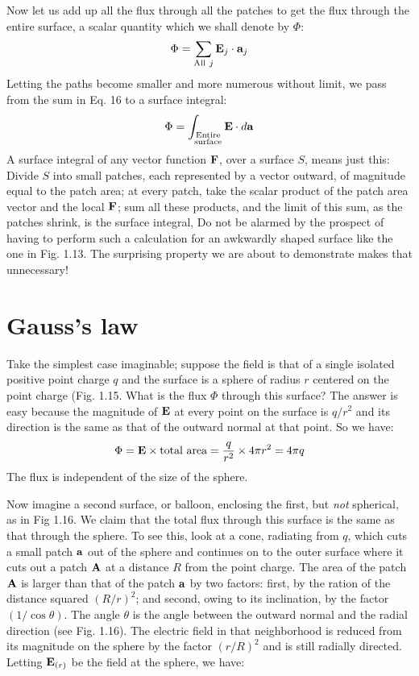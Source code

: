 Now let us add up all the flux through all the patches to get the
flux through the entire surface, a scalar quantity which we shall
denote by $\Phi$:
\begin{equation} 
  \Phi= \sum\limits_{\text{All}~j}\mathbf{E}_j \cdot \mathbf{a}_j 
\end{equation}
Letting the paths become smaller and more numerous without limit, we
pass from the sum in Eq. 16 to a surface integral:
\begin{equation}
  \Phi= \int\nolimits_{\substack{\text{Entire}\\\text{surface}}}\mathbf{E} \cdot d\mathbf{a}
\end{equation}
A surface integral of any vector function $\mathbf{F}$, over a surface
$S$, means just this: Divide $S$ into small patches, each represented
by a vector outward, of magnitude equal to the patch area; at every
patch, take the scalar product of the patch area vector and the local
$\mathbf{F}$; sum all these products, and the limit of this sum, as the
patches shrink, is the surface integral, Do not be alarmed by the
prospect of having to perform such a calculation for an awkwardly
shaped surface like the one in Fig. 1.13. The surprising property
we are about to demonstrate makes that unnecessary!

\section{Gauss's law}

Take the simplest case imaginable; suppose the field is that of a
single isolated positive point charge $q$ and the surface is a sphere
of radius $r$ centered on the point charge (Fig. 1.15. What is the
flux $\Phi$ through this surface? The answer is easy because the
magnitude of $\mathbf{E}$ at every point on the surface is $q/r^2$ and its
direction is the same as that of the outward normal at that point.
So we have:
\begin{equation} 
  \Phi =  {\mathbf{E}}\times \text{total area} = \frac{q}{r^2} \times 4\pi r^2 =  4\pi q 
\end{equation}
The flux is independent of the size of the sphere.


Now imagine a second surface, or balloon, enclosing the first, but
\emph{not} spherical, as in Fig 1.16. We claim that the total flux
through this surface is the same as that through the sphere.
To see this, look at a cone, radiating from $q$, which cuts a small
patch $\mathbf{a}$ out of the sphere and continues on to the outer surface
where it cuts out a patch $\mathbf{A}$ at a distance $R$ from the point
charge. The area of the patch $\mathbf{A}$ is larger than that of the patch
$\mathbf{a}$ by two factors: first, by the ration of the distance squared
$(R/r)^2$; and second, owing to its inclination, by the factor
$(1/\cos\theta)$. The angle $\theta$ is the angle between the outward
normal and the radial direction (see Fig. 1.16). The electric field
in that neighborhood is reduced from its magnitude on the sphere by
the factor $(r/R)^2$ and is still radially directed.
Letting $\mathbf{E}_{(r)}$ be the field at the sphere,
we have:

